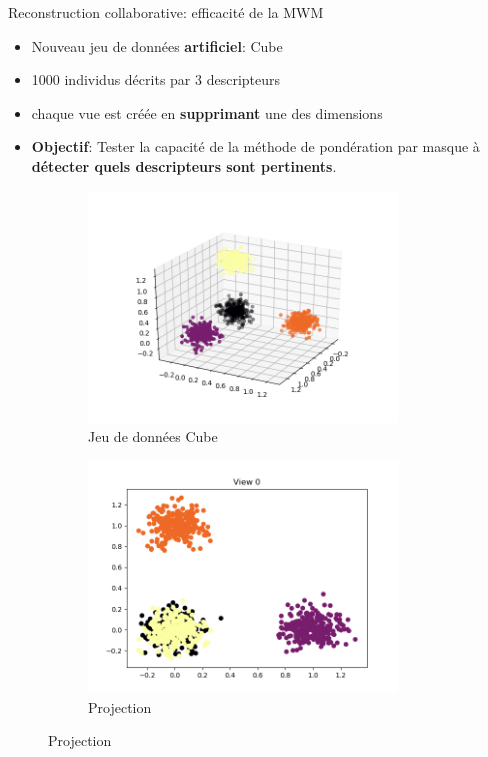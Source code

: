 \documentclass[hyperref={pdfpagelabels=false}]{beamer}
\begin{document}
    \begin{frame}{Reconstruction collaborative: efficacité de la MWM}

        \begin{itemize}
            \item Nouveau jeu de données \textbf{artificiel}: Cube
            \item 1000 individus décrits par 
                3 descripteurs
            \item chaque vue est créée en \textbf{supprimant} une des dimensions
            \item \textbf{Objectif}: Tester la capacité de la méthode de 
                pondération par masque à \textbf{détecter quels descripteurs 
                sont pertinents}.
        \end{itemize}
        \begin{figure}[h]
            \centering
            \begin{subfigure}[h]{0.49\textwidth}
                \centering
                \includegraphics[width=0.9\textwidth]{data}
                \caption{Jeu de données Cube}
            \end{subfigure}
            \begin{subfigure}[h]{0.49\textwidth}
                \centering
                \includegraphics[width=0.9\textwidth]{projection0}
                \caption{Projection}
            \end{subfigure}
        \end{figure}
    \end{frame}
\end{document}
